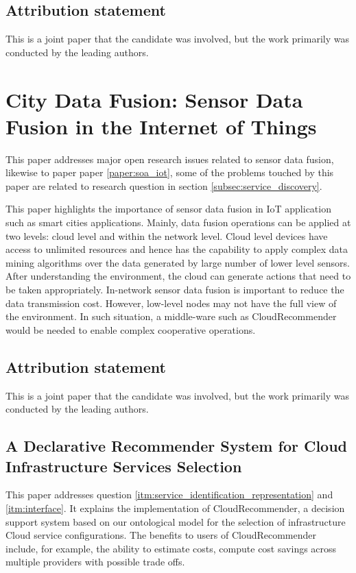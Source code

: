 \subsection{Attribution statement}
This is a joint paper that the candidate was involved, but the work primarily was conducted by the leading authors.

\section{City Data Fusion: Sensor Data Fusion in the Internet of Things}
\label{paper:ct_data_fusion}
This paper addresses major open research issues related to sensor data fusion, likewise to paper paper \ref{paper:soa_iot}, some of the problems touched by this paper are related to research question in section \ref{subsec:service_discovery}.  

This paper highlights the importance of sensor data fusion in IoT application such as smart
cities applications. Mainly, data fusion operations can be applied at two levels: cloud level and within the network level. Cloud level devices have access to unlimited resources and hence has the capability to apply complex data mining algorithms over the data generated by large number of lower level sensors. After understanding the environment, the cloud can generate actions that need to be taken appropriately. In-network sensor data fusion is important to reduce the data transmission cost. However, low-level nodes may not have the full view of the environment. In such situation, a middle-ware such as CloudRecommender would be needed to enable complex cooperative operations.

\subsection{Attribution statement}
This is a joint paper that the candidate was involved, but the work primarily was conducted by the leading authors.

\subsection{A Declarative Recommender System for Cloud Infrastructure Services Selection}
\label{paper:single_criteria}

This paper addresses question \ref{itm:service_identification_representation} and \ref{itm:interface}. It explains the implementation of CloudRecommender, a decision support system based on our ontological model for the selection of infrastructure Cloud service configurations. The benefits to users of CloudRecommender include, for example, the ability to estimate costs, compute cost savings across multiple providers with possible trade offs.


